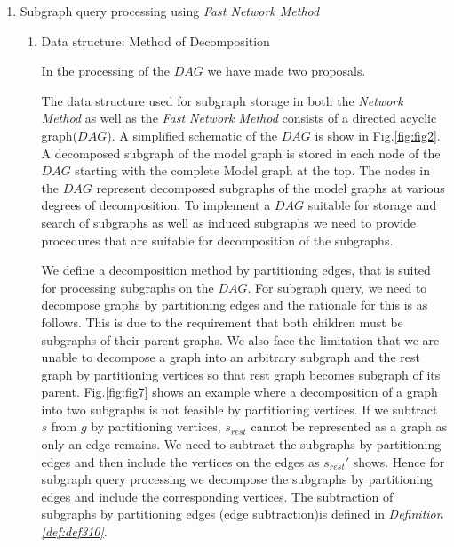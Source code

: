 \begin{enumerate}
\begin{enumerate}
\end{enumerate}

\item  Subgraph query processing using \textit{Fast Network Method}

\begin{enumerate}

\item Data structure: Method of Decomposition

In the processing of the $DAG$ we have made two proposals.



The data structure used for subgraph storage in both the \textit{Network Method} as well as the \textit{Fast Network Method} consists of a directed acyclic graph($DAG$). 
A simplified schematic of the $DAG$ is show in Fig.\ref{fig:fig2}.  
A decomposed subgraph of the model graph is stored in each node of the $DAG$ starting with the complete Model graph at the top.
The nodes in the $DAG$ represent decomposed subgraphs of the model graphs at various degrees of decomposition. 
To implement a $DAG$ suitable for storage and search of subgraphs as well as induced subgraphs we need to provide procedures that are suitable for decomposition of the subgraphs.



We define a decomposition method by partitioning edges, that is suited for processing subgraphs on the $DAG$.
For subgraph query, we need to decompose graphs by partitioning edges and the rationale for this is as follows. 
This is due to the requirement that both children must be subgraphs of their parent graphs.
We also face the limitation that we are unable to decompose a graph into an arbitrary subgraph and the rest graph by partitioning vertices so that rest graph becomes subgraph of its parent.
Fig.\ref{fig:fig7} shows an example where a decomposition of a graph into two subgraphs is not feasible by partitioning vertices.
If we subtract $s$ from $g$ by partitioning vertices, $s_{rest}$ cannot be represented as a graph as only an edge remains. 
We need to subtract the subgraphs by partitioning edges and then include the vertices on the edges as $s_{rest}'$ shows. 
Hence for subgraph query processing we decompose the subgraphs by partitioning edges and include the corresponding vertices.
The subtraction of subgraphs by partitioning edges (edge subtraction)is defined in \textit{Definition \ref{def:def310}}.



\end{enumerate}
\end{enumerate}
